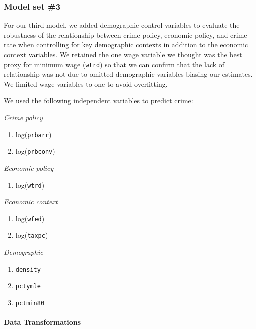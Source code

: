 \documentclass[]{article}
\providecommand{\tightlist}{%
  \setlength{\itemsep}{0pt}\setlength{\parskip}{0pt}}
\let\oldparagraph\paragraph
\renewcommand{\paragraph}[1]{\oldparagraph{#1}\mbox{}}
\begin{document}
\hypertarget{model-set-3}{%
\subsubsection{Model set \#3}\label{model-set-3}}

For our third model, we added demographic control variables to evaluate
the robustness of the relationship between crime policy, economic
policy, and crime rate when controlling for key demographic contexts in
addition to the economic context variables. We retained the one wage
variable we thought was the best proxy for minimum wage (\texttt{wtrd})
so that we can confirm that the lack of relationship was not due to
omitted demographic variables biasing our estimates. We limited wage
variables to one to avoid overfitting.

We used the following independent variables to predict crime:

\emph{Crime policy}

\begin{enumerate}
\def\labelenumi{(\arabic{enumi})}
\item
  log(\texttt{prbarr})
\item
  log(\texttt{prbconv})
\end{enumerate}

\emph{Economic policy}

\begin{enumerate}
\def\labelenumi{(\arabic{enumi})}
\setcounter{enumi}{2}
\tightlist
\item
  log(\texttt{wtrd})
\end{enumerate}

\emph{Economic context}

\begin{enumerate}
\def\labelenumi{(\arabic{enumi})}
\setcounter{enumi}{3}
\item
  log(\texttt{wfed})
\item
  log(\texttt{taxpc})
\end{enumerate}

\emph{Demographic}

\begin{enumerate}
\def\labelenumi{(\arabic{enumi})}
\setcounter{enumi}{5}
\item
  \texttt{density}
\item
  \texttt{pctymle}
\item
  \texttt{pctmin80}
\end{enumerate}

\hypertarget{data-transformations-2}{%
\paragraph{Data Transformations}\label{data-transformations-2}}
\end{document}
